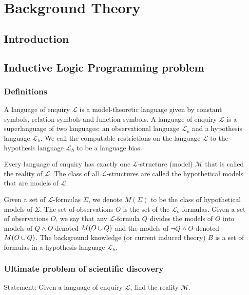 
\chapter{Background Theory}

\label{ch:background}

\section{Introduction}

\section{Inductive Logic Programming problem}

\subsection{Definitions}

A language of enquiry $\mathcal{L}$ is a model-theoretic language given by constant symbols, relation symbols and function symbols. A language of enquiry $\mathcal{L}$ is a superlanguage of two languages: an observational language $\mathcal{L}_o$ and a hypothesis language $\mathcal{L}_h$. We call the computable restrictions on the language $\mathcal{L}$ to the hypothesis language $\mathcal{L}_h$ to be a language bias.

Every language of enquiry has exactly one $\mathcal{L}$-structure (model) $\mathcal{M}$ that is called the reality of $\mathcal{L}$. The class of all $\mathcal{L}$-structures are called the hypothetical models that are models of $\mathcal{L}$.

Given a set of $\mathcal{L}$-formulas $\Sigma$, we denote $M(\Sigma)$ to be the class of hypothetical models of $\Sigma$. The set of observations $O$ is the set of the $\mathcal{L}_o$-formulas.
Given a set of observations $O$, we say that any $\mathcal{L}$-formula $Q$ divides the models of $O$ into models of $Q \wedge O$ denoted $M(O \cup {Q})$ and the models of $\neg Q \wedge O$ denoted $M(O \cup {Q})$.
The background knowledge (or current induced theory) $B$ is a set of formulas in a hypothesis language $\mathcal{L}_h$.

\subsection{Ultimate problem of scientific discovery}
Statement: Given a language of enquiry $\mathcal{L}$, find the reality $\mathcal{M}$.

